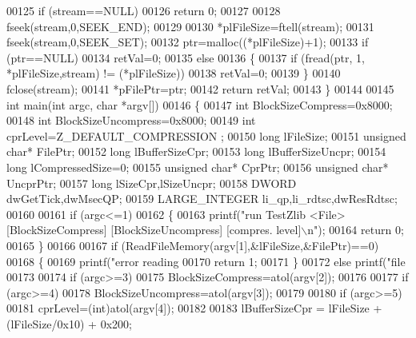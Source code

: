 \begin{DoxyCode}
{{00125     \textcolor{keywordflow}{if} (stream==NULL)
00126         \textcolor{keywordflow}{return} 0;
00127 
00128     fseek(stream,0,SEEK\_END);
00129 
00130     *plFileSize=ftell(stream);
00131     fseek(stream,0,SEEK\_SET);
00132     ptr=malloc((*plFileSize)+1);
00133     \textcolor{keywordflow}{if} (ptr==NULL)
00134         retVal=0;
00135     \textcolor{keywordflow}{else}
00136     \{
00137         \textcolor{keywordflow}{if} (fread(ptr, 1, *plFileSize,stream) != (*plFileSize))
00138             retVal=0;
00139     \}
00140     fclose(stream);
00141     *pFilePtr=ptr;
00142     \textcolor{keywordflow}{return} retVal;
00143 \}
00144 
00145 \textcolor{keywordtype}{int} main(\textcolor{keywordtype}{int} argc, \textcolor{keywordtype}{char} *argv[])
00146 \{
00147     \textcolor{keywordtype}{int} BlockSizeCompress=0x8000;
00148     \textcolor{keywordtype}{int} BlockSizeUncompress=0x8000;
00149     \textcolor{keywordtype}{int} cprLevel=Z\_DEFAULT\_COMPRESSION ;
00150     \textcolor{keywordtype}{long} lFileSize;
00151     \textcolor{keywordtype}{unsigned} \textcolor{keywordtype}{char}* FilePtr;
00152     \textcolor{keywordtype}{long} lBufferSizeCpr;
00153     \textcolor{keywordtype}{long} lBufferSizeUncpr;
00154     \textcolor{keywordtype}{long} lCompressedSize=0;
00155     \textcolor{keywordtype}{unsigned} \textcolor{keywordtype}{char}* CprPtr;
00156     \textcolor{keywordtype}{unsigned} \textcolor{keywordtype}{char}* UncprPtr;
00157     \textcolor{keywordtype}{long} lSizeCpr,lSizeUncpr;
00158     DWORD dwGetTick,dwMsecQP;
00159     LARGE\_INTEGER li\_qp,li\_rdtsc,dwResRdtsc;
00160 
00161     \textcolor{keywordflow}{if} (argc<=1)
00162     \{
00163         printf(\textcolor{stringliteral}{"run TestZlib <File> [BlockSizeCompress] [BlockSizeUncompress] [compres. level]\(\backslash\)n"});
00164         \textcolor{keywordflow}{return} 0;
00165     \}
00166 
00167     \textcolor{keywordflow}{if} (ReadFileMemory(argv[1],&lFileSize,&FilePtr)==0)
00168     \{
00169         printf(\textcolor{stringliteral}{"error reading %
00170         \textcolor{keywordflow}{return} 1;
00171     \}
00172     \textcolor{keywordflow}{else} printf(\textcolor{stringliteral}{"file %
00173 
00174     \textcolor{keywordflow}{if} (argc>=3)
00175         BlockSizeCompress=atol(argv[2]);
00176 
00177     \textcolor{keywordflow}{if} (argc>=4)
00178         BlockSizeUncompress=atol(argv[3]);
00179 
00180     \textcolor{keywordflow}{if} (argc>=5)
00181         cprLevel=(int)atol(argv[4]);
00182 
00183     lBufferSizeCpr = lFileSize + (lFileSize/0x10) + 0x200;
}}}}
\end{DoxyCode}
